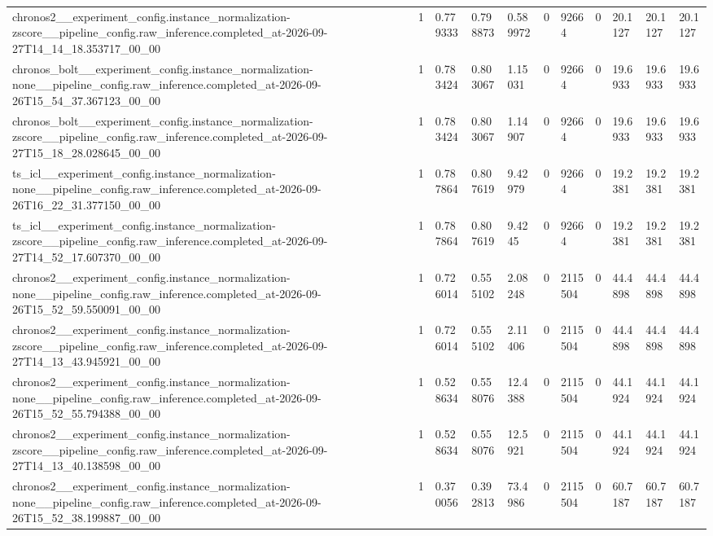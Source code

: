 \begin{tabular}{lllllllllll}
chronos2\_\_experiment\_config.instance\_normalization-zscore\_\_pipeline\_config.raw\_inference.completed\_at-2026-09-27T14\_14\_18.353717\_00\_00 & 1 & 0.779333 & 0.798873 & 0.589972 & 0 & 92664 & 0 & 20.1127 & 20.1127 & 20.1127 \\
chronos\_bolt\_\_experiment\_config.instance\_normalization-none\_\_pipeline\_config.raw\_inference.completed\_at-2026-09-26T15\_54\_37.367123\_00\_00 & 1 & 0.783424 & 0.803067 & 1.15031 & 0 & 92664 & 0 & 19.6933 & 19.6933 & 19.6933 \\
chronos\_bolt\_\_experiment\_config.instance\_normalization-zscore\_\_pipeline\_config.raw\_inference.completed\_at-2026-09-27T15\_18\_28.028645\_00\_00 & 1 & 0.783424 & 0.803067 & 1.14907 & 0 & 92664 & 0 & 19.6933 & 19.6933 & 19.6933 \\
ts\_icl\_\_experiment\_config.instance\_normalization-none\_\_pipeline\_config.raw\_inference.completed\_at-2026-09-26T16\_22\_31.377150\_00\_00 & 1 & 0.787864 & 0.807619 & 9.42979 & 0 & 92664 & 0 & 19.2381 & 19.2381 & 19.2381 \\
ts\_icl\_\_experiment\_config.instance\_normalization-zscore\_\_pipeline\_config.raw\_inference.completed\_at-2026-09-27T14\_52\_17.607370\_00\_00 & 1 & 0.787864 & 0.807619 & 9.4245 & 0 & 92664 & 0 & 19.2381 & 19.2381 & 19.2381 \\
chronos2\_\_experiment\_config.instance\_normalization-none\_\_pipeline\_config.raw\_inference.completed\_at-2026-09-26T15\_52\_59.550091\_00\_00 & 1 & 0.726014 & 0.555102 & 2.08248 & 0 & 2115504 & 0 & 44.4898 & 44.4898 & 44.4898 \\
chronos2\_\_experiment\_config.instance\_normalization-zscore\_\_pipeline\_config.raw\_inference.completed\_at-2026-09-27T14\_13\_43.945921\_00\_00 & 1 & 0.726014 & 0.555102 & 2.11406 & 0 & 2115504 & 0 & 44.4898 & 44.4898 & 44.4898 \\
chronos2\_\_experiment\_config.instance\_normalization-none\_\_pipeline\_config.raw\_inference.completed\_at-2026-09-26T15\_52\_55.794388\_00\_00 & 1 & 0.528634 & 0.558076 & 12.4388 & 0 & 2115504 & 0 & 44.1924 & 44.1924 & 44.1924 \\
chronos2\_\_experiment\_config.instance\_normalization-zscore\_\_pipeline\_config.raw\_inference.completed\_at-2026-09-27T14\_13\_40.138598\_00\_00 & 1 & 0.528634 & 0.558076 & 12.5921 & 0 & 2115504 & 0 & 44.1924 & 44.1924 & 44.1924 \\
chronos2\_\_experiment\_config.instance\_normalization-none\_\_pipeline\_config.raw\_inference.completed\_at-2026-09-26T15\_52\_38.199887\_00\_00 & 1 & 0.370056 & 0.392813 & 73.4986 & 0 & 2115504 & 0 & 60.7187 & 60.7187 & 60.7187 \\

\end{tabular}

